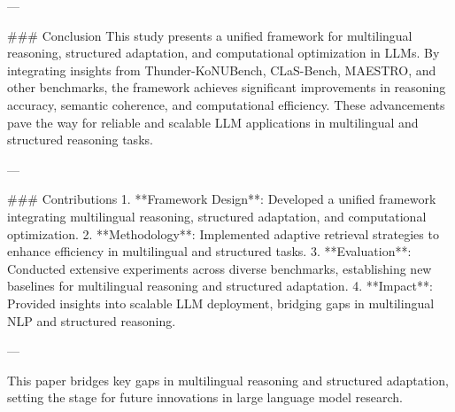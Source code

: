 ---

### Conclusion  
This study presents a unified framework for multilingual reasoning, structured adaptation, and computational optimization in LLMs. By integrating insights from Thunder-KoNUBench, CLaS-Bench, MAESTRO, and other benchmarks, the framework achieves significant improvements in reasoning accuracy, semantic coherence, and computational efficiency. These advancements pave the way for reliable and scalable LLM applications in multilingual and structured reasoning tasks.

---

### Contributions  
1. **Framework Design**: Developed a unified framework integrating multilingual reasoning, structured adaptation, and computational optimization.  
2. **Methodology**: Implemented adaptive retrieval strategies to enhance efficiency in multilingual and structured tasks.  
3. **Evaluation**: Conducted extensive experiments across diverse benchmarks, establishing new baselines for multilingual reasoning and structured adaptation.  
4. **Impact**: Provided insights into scalable LLM deployment, bridging gaps in multilingual NLP and structured reasoning.

--- 

This paper bridges key gaps in multilingual reasoning and structured adaptation, setting the stage for future innovations in large language model research.